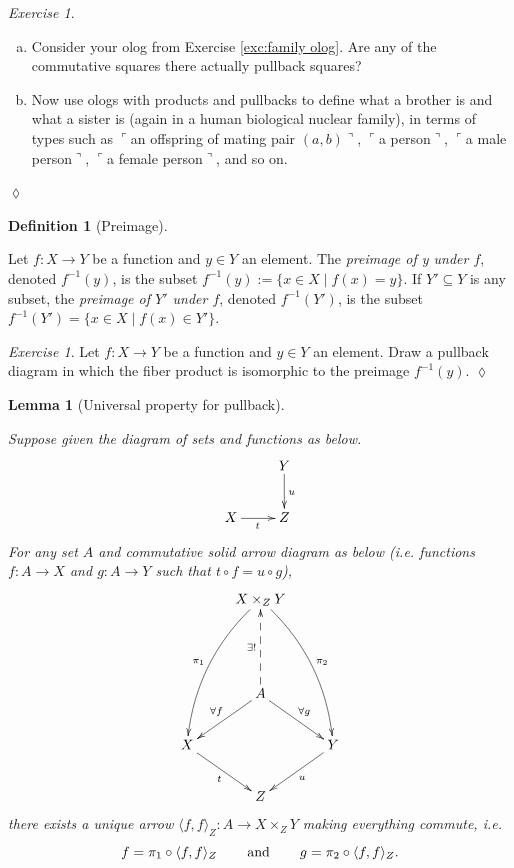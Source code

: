 \documentclass{book}
\def\tn{\textnormal}
\def\hsp{\hspace{.3in}}
\def\to{\rightarrow}
\def\taking{\colon}
\def\ss{\subseteq}
\def\|{{\;|\;}}
\def\m1{{-1}}
\def\la{\langle}
\def\ra{\rangle}
\newcommand{\fakebox}[1]{\tn{$\ulcorner$#1$\urcorner$}}
\newcommand{\prodmap}[2]{\la#1,#2\ra}
\newcommand{\pb}[3]{\prodmap{#1}{#1}_{#3}}
\newtheorem{lemma}[subsubsection]{Lemma}
\theoremstyle{remark}
\newtheorem{exc}[subsubsection]{Exercise}
\newenvironment{exercise}{\begin{exc}}{\hspace*{\fill}$\lozenge$\end{exc}}
\theoremstyle{definition}
\newtheorem{definition}[subsubsection]{Definition}
\def\sexc{\begin{enumerate}[a.)]\setlength{\itemsep}{.1cm}\setlength{\parskip}{.1cm}\item}
\def\next{\item}
\def\endsexc{\end{enumerate}}
\begin{document}
\begin{exercise}~
\sexc Consider your olog from Exercise \ref{exc:family olog}. Are any of the commutative squares there actually pullback squares? 
\next Now use ologs with products and pullbacks to define what a brother is and what a sister is (again in a human biological nuclear family), in terms of types such as \fakebox{an offspring of mating pair $(a,b)$}, \fakebox{a person}, \fakebox{a male person}, \fakebox{a female person}, and so on.
\endsexc
\end{exercise}

\begin{definition}[Preimage]\label{def:preimage}

Let $f\taking X\to Y$ be a function and $y\in Y$ an element. The {\em preimage of y under $f$}, denoted $f^\m1(y)$,\index{a symbol!$f^\m1$} is  the subset $f^\m1(y):=\{x\in X\|f(x)=y\}$. If $Y'\ss Y$ is any subset, the {\em preimage of $Y'$ under $f$}, denoted $f^\m1(Y')$, is the subset $f^\m1(Y')=\{x\in X\|f(x)\in Y'\}$.

\end{definition}

\begin{exercise}
Let $f\taking X\to Y$ be a function and $y\in Y$ an element. Draw a pullback diagram in which the fiber product is isomorphic to the preimage $f^\m1(y)$.
\end{exercise}

\begin{lemma}[Universal property for pullback]\label{lemma:up for fp}

Suppose given the diagram of sets and functions as below.
\begin{align*}
\xymatrix{&Y\ar[d]^u\\
X\ar[r]_t&Z}
\end{align*}
For any set $A$ and commutative solid arrow diagram as below (i.e. functions $f\taking A\to X$ and $g\taking A\to Y$ such that $t\circ f=u\circ g$), 
\begin{align}\label{dia:universal property of fp}
\xymatrix{
&X\times_ZY\ar@/_1pc/[lddd]_{\pi_1}\ar@/^1pc/[rddd]^{\pi_2}\\\\
&A\ar@{-->}[uu]^{\exists!}\ar[dl]_{\forall f}\ar[dr]^{\forall g}&\\
X\ar[rd]_t&&Y\ar[ld]^u\\
&Z&}
\end{align}
there exists a unique arrow $\pb{f}{g}{Z}\taking A\to X\times_ZY$ making everything commute, i.e. 
$$f=\pi_1\circ \pb{f}{g}{Z}\hsp\text{and}\hsp g=\pi_2\circ\pb{f}{g}{Z}.$$

\end{lemma}
\end{document}
